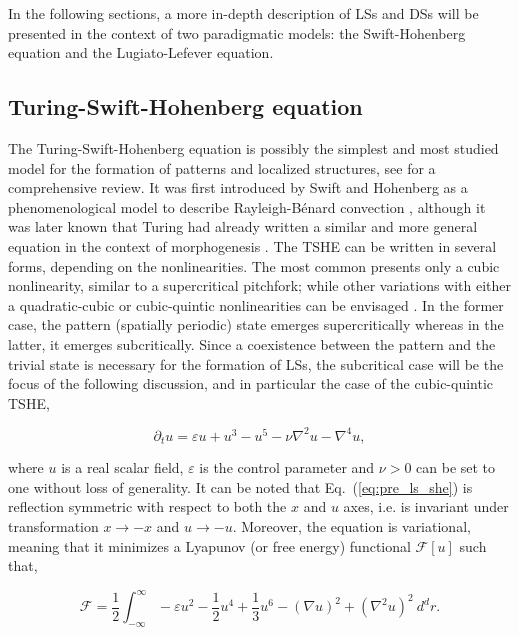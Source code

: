 In the following sections, a more in-depth description of LSs and DSs will be presented 
in the context of two paradigmatic models: the Swift-Hohenberg equation and the Lugiato-Lefever
equation.  


\subsection{Turing-Swift-Hohenberg equation}

The Turing-Swift-Hohenberg equation is possibly the simplest and most studied model 
for the formation of patterns and localized structures, see \cite{cross1993pattern,knobloch2015spatial}
for a comprehensive review. It was first introduced
by Swift and Hohenberg as a phenomenological model to describe Rayleigh-Bénard
convection \cite{swift1977hydrodynamic,pomeau1979stability}, although it was later 
known that Turing had already written 
a similar and more general equation in the context of morphogenesis \cite{dawes2016after}.
The TSHE can be written in several forms, depending on the nonlinearities. The most common
presents only a cubic nonlinearity, similar to a supercritical pitchfork; while other
variations with either a quadratic-cubic or cubic-quintic nonlinearities can be envisaged \cite{knobloch2015spatial}.
In the former case, the pattern (spatially periodic) state emerges supercritically whereas in the latter,
it emerges subcritically. Since a coexistence between the pattern and the trivial state is necessary for the formation of LSs,
the subcritical case will be the focus of the following discussion, and in particular the case of 
the cubic-quintic TSHE,

\begin{equation}
    \partial_t u = \varepsilon u + u ^3 - u^5 - \nu \nabla^2 u - \nabla^4 u,
    \label{eq:pre_ls_she}
\end{equation}

where $u$ is a real scalar field, $\varepsilon$ is the control parameter and $\nu>0$ can be set to
one without loss of generality. It can be noted that Eq.~(\ref{eq:pre_ls_she}) is reflection symmetric
with respect to both the $x$ and $u$ axes, i.e. is invariant under transformation $x\to -x$ and $u\to -u$.
Moreover, the equation is variational, meaning that it minimizes a Lyapunov (or free energy) functional
$\mathcal{F}[u]$ such that,

\begin{equation}
    \mathcal{F} = \dfrac12 \int_{-\infty}^{\infty} -\varepsilon u^2 - \dfrac12 u^4 + \dfrac13 u^6 - (\nabla u)^2 + (\nabla^2 u)^2 \ d^dr.
\end{equation}

